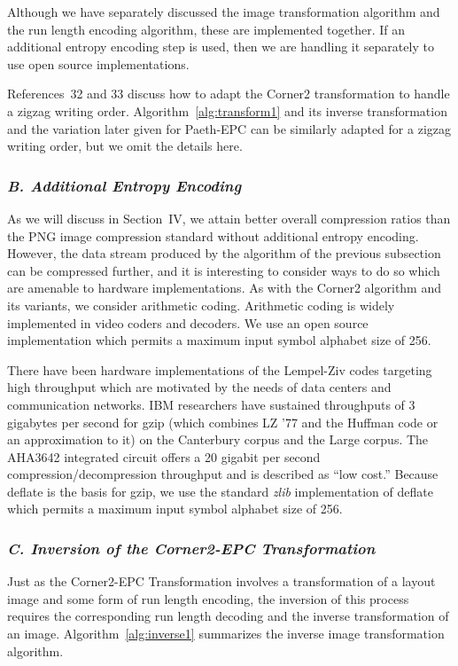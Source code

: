 \documentclass{article}
\begin{document}
Although we have separately discussed the image transformation algorithm
and the run length encoding algorithm, these are implemented together.
If an additional entropy encoding step is used, then we are handling it
separately to use open source implementations.

References~32 and 33 discuss
how to adapt the Corner2 transformation to handle a zigzag writing order.
Algorithm~\ref{alg:transform1} and its inverse transformation and the
variation later given for Paeth-EPC can be
similarly adapted for a zigzag writing order, but we omit the details here.

\subsubsection*{{\em B. Additional Entropy Encoding}}
As we will discuss in Section~IV, we attain better overall compression
ratios than the PNG image compression standard without additional entropy
encoding.  However, the data stream produced by the algorithm of the previous
subsection can be compressed further, and it is interesting to consider ways
to do so which are amenable to hardware implementations.  As with the
Corner2 algorithm and its variants, we consider arithmetic coding.
Arithmetic coding is widely implemented in video coders and 
decoders.  We use an open source implementation
which permits a maximum input symbol alphabet size of 256.

There have been hardware implementations of the Lempel-Ziv codes targeting
high throughput which are motivated by the needs of data centers and
communication networks.  IBM researchers have sustained
throughputs of 3 gigabytes per second for gzip (which combines
LZ '77 and the Huffman code or an approximation to it) on the Canterbury
corpus and the Large corpus.  The AHA3642 integrated circuit
offers a 20 gigabit per second compression/decompression throughput and is
described as ``low cost.''  Because deflate is the basis for gzip,
we use the standard {\em zlib} implementation of deflate
which permits a maximum input symbol alphabet size of 256.


\subsubsection*{{\em C. Inversion of the Corner2-EPC Transformation}}
Just as the Corner2-EPC Transformation involves a transformation of a
layout image and some form of run length encoding, the inversion of this
process requires the corresponding run length decoding and the inverse
transformation of an image.  Algorithm~\ref{alg:inverse1} summarizes
the inverse image transformation algorithm.
\end{document}
